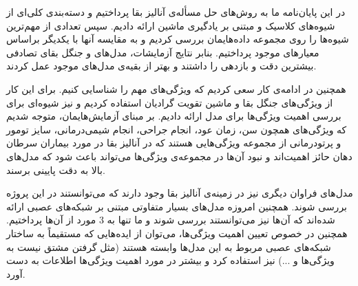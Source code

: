 

در این پایان‌نامه ما به روش‌های حل مسأله‌ی آنالیز بقا پرداختیم و دسته‌بندی کلی‌ای از شیوه‌های کلاسیک و مبتنی بر یادگیری ماشین ارائه دادیم. سپس تعدادی از مهم‌ترین شیوه‌ها را روی مجموعه داده‌هایمان بررسی کردیم و به مقایسه آنها با یکدیگر براساس معیارهای موجود پرداختیم. بنابر نتایج آزمایشات، مدل‌های  و جنگل بقای تصادفی بیشترین دقت و بازدهی را داشتند و بهتر از بقیه‌ی مدل‌های موجود عمل کردند.

همچنین در ادامه‌ی کار سعی کردیم که ویژگی‌های مهم را شناسایی کنیم. برای این کار از ویژگی‌های جنگل بقا و ماشین تقویت گرادیان استفاده کردیم و نیز شیوه‌ای برای بررسی اهمیت ویژگی‌ها برای مدل  ارائه دادیم. بر مبنای آزمایش‌هایمان، متوجه شدیم که ویژگی‌های همچون سن، زمان عود، انجام جراحی، انجام شیمی‌درمانی، سایز تومور و پرتودرمانی از مجموعه ویژگی‌هایی هستند که در آنالیز بقا در مورد بیماران سرطان دهان حائز اهمیت‌اند و نبود آن‌ها در مجموعه‌ی ویژگی‌ها می‌تواند باعث شود که مدل‌های بالا به دقت پایینی برسند.

مدل‌های فراوان دیگری نیز در زمینه‌ی آنالیز بقا وجود دارند که می‌توانستند در این پروژه بررسی شوند. همچنین امروزه مدل‌های بسیار متفاوتی مبتنی بر شبکه‌های عصبی ارائه شده‌اند که آن‌ها نیز می‌توانستند بررسی شوند و ما تنها به $3$ مورد از آن‌ها پرداختیم. همچنین در خصوص تعیین اهمیت ویژگی‌ها، می‌توان از ایده‌هایی که مستقیماً به ساختار شبکه‌های عصبی مربوط به این مدل‌ها وابسته هستند (مثل گرفتن مشتق نیست به ویژگی‌ها و ...) نیز استفاده کرد و بیشتر در مورد اهمیت ویژگی‌ها اطلاعات به دست آورد.

